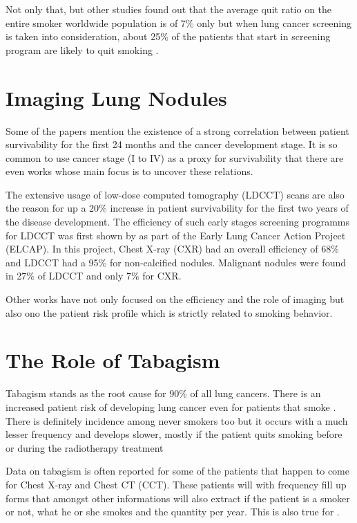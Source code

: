 Not only that, but other studies found out that the average quit ratio on the entire smoker worldwide population is of 7\% only but when lung  cancer screening is taken into consideration, about 25\% of the patients that start in screening program are likely to quit smoking \cite{fox2003}\cite{aalst2010}. %

\section{Imaging Lung Nodules}

Some of the papers mention the existence of a strong correlation between patient survivability for the first 24 months and the cancer development stage. It is so common to use cancer stage (I to IV) as a proxy for survivability that there are even works whose main focus is to uncover these relations\cite{roberts2013}\cite{fox2003}.

The extensive usage of low-dose computed tomography (LDCCT) scans are also the reason for up a 20\% increase in patient survivability for the first two years of the disease development\cite{fox2003}\cite{macredmond2006}\cite{mountain2008}\cite{jaklitsch2012}. The efficiency of such early stages screening programms for LDCCT was first shown by  as part of the Early Lung Cancer Action  Project (ELCAP). In this project, Chest X-ray (CXR) had an overall efficiency of 68\% and LDCCT had a 95\% for non-calcified nodules. Malignant nodules were found in 27\% of LDCCT and only 7\% for CXR. 

Other works have not only focused on the efficiency and the role of imaging but also ono the patient risk profile which is strictly related to smoking behavior.

\section{The Role of Tabagism}

Tabagism stands as the root cause for 90\% of all lung cancers. There is an increased patient risk of developing lung cancer even for patients that smoke \cite{ostroff2001}\cite{aalst2010}\cite{aalst2011}. There is definitely incidence among never smokers too but it occurs with a much lesser frequency and develops slower, mostly if the patient quits smoking before or during the radiotherapy treatment \cite{fox2003}\cite{rivera2016}

Data on tabagism is often reported for some of the patients that happen to come for Chest X-ray and Chest CT (CCT). These patients will with frequency fill up forms that amongst other informations will also extract if the patient is a smoker or not, what he or she smokes and the quantity per year. This is also true for \nomeHsl{}. 

